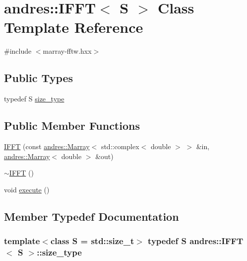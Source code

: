 \hypertarget{classandres_1_1IFFT}{}\section{andres\+:\+:I\+F\+F\+T$<$ S $>$ Class Template Reference}
\label{classandres_1_1IFFT}


{\ttfamily \#include $<$marray-\/fftw.\+hxx$>$}

\subsection*{Public Types}
\begin{DoxyCompactItemize}
\item 
typedef S \hyperlink{classandres_1_1IFFT_a15dbc48e17ab7f5f8de2fcdd507eaba5}{size\+\_\+type}
\end{DoxyCompactItemize}
\subsection*{Public Member Functions}
\begin{DoxyCompactItemize}
\item 
\hyperlink{classandres_1_1IFFT_ab99387b8042cb2f7748ff735fa227d34}{I\+F\+F\+T} (const \hyperlink{classandres_1_1Marray}{andres\+::\+Marray}$<$ std\+::complex$<$ double $>$ $>$ \&in, \hyperlink{classandres_1_1Marray}{andres\+::\+Marray}$<$ double $>$ \&out)
\item 
\hyperlink{classandres_1_1IFFT_a01d5f0a0d262ee285b0517559418cf97}{$\sim$\+I\+F\+F\+T} ()
\item 
void \hyperlink{classandres_1_1IFFT_aa73b7f9e34a4e62f6d2ff244a656dc71}{execute} ()
\end{DoxyCompactItemize}


\subsection{Member Typedef Documentation}
\hypertarget{classandres_1_1IFFT_a15dbc48e17ab7f5f8de2fcdd507eaba5}{}
\subsubsection[{size\+\_\+type}]{\setlength{\rightskip}{0pt plus 5cm}template$<$class S  = std\+::size\+\_\+t$>$ typedef S {\bf andres\+::\+I\+F\+F\+T}$<$ S $>$\+::{\bf size\+\_\+type}}\label{classandres_1_1IFFT_a15dbc48e17ab7f5f8de2fcdd507eaba5}


